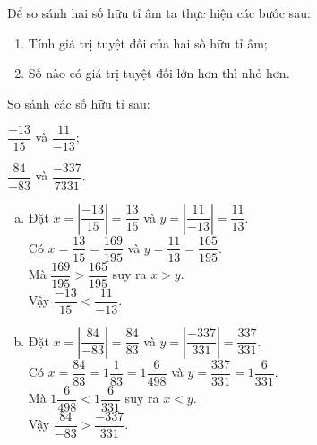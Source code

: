 \begin{dang}
Để so sánh hai số hữu tỉ âm ta thực hiện các bước sau:
\begin{enumerate}[\tickEX]
	\item Tính giá trị tuyệt đối của hai số hữu tỉ âm;
	\item Số nào có giá trị tuyệt đối lớn hơn thì nhỏ hơn.
\end{enumerate}
\end{dang}
\begin{vd}
So sánh các số hữu tỉ sau:
\begin{listEX}[2]
	\item $\dfrac{-13}{15}$ và $\dfrac{11}{-13}$;
	\item $\dfrac{84}{-83}$ và  $\dfrac{-337}{7331}$.
\end{listEX}
\loigiai
{\begin{enumerate}[a)]
		\item Đặt $x=\left|\dfrac{-13}{15}\right|=\dfrac{13}{15}$ và $y=\left|\dfrac{11}{-13}\right|=\dfrac{11}{13}$.\\
		Có $x=\dfrac{13}{15}=\dfrac{169}{195}$ và $y=\dfrac{11}{13}=\dfrac{165}{195}$.\\
		 Mà $\dfrac{169}{195}>\dfrac{165}{195}$ suy ra $x>y$.\\
		 Vậy $\dfrac{-13}{15}<\dfrac{11}{-13}$.
		 \item Đặt $x=\left|\dfrac{84}{-83}\right|=\dfrac{84}{83}$ và $y=\left|\dfrac{-337}{331}\right|=\dfrac{337}{331}$.\\
		 Có $x=\dfrac{84}{83}=1\dfrac{1}{83}=1\dfrac{6}{498}$ và $y=\dfrac{337}{331}=1\dfrac{6}{331}$.\\
		 Mà $1\dfrac{6}{498}<1\dfrac{6}{331}$ suy ra $x<y$. \\
		 Vậy $\dfrac{84}{-83}>\dfrac{-337}{331}$.
	\end{enumerate}
}
\end{vd}


